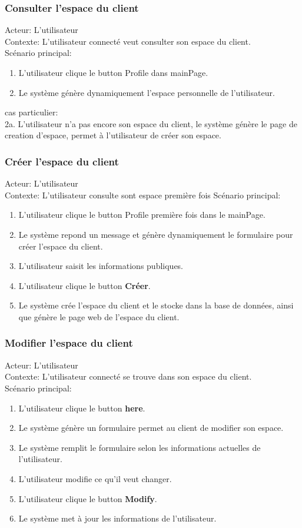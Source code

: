 \documentclass[14px]{article}
\begin{document}
\subsubsection{Consulter l'espace du client}
Acteur: L'utilisateur\\
Contexte: L'utilisateur connecté veut consulter son espace du client.\\
Scénario principal:
\begin{enumerate}
	\item L'utilisateur clique le button Profile dans mainPage.
	\item Le système génère dynamiquement l'espace personnelle de l'utilisateur.
\end{enumerate}
cas particulier:\\
2a. L'utilisateur n'a pas encore son espace du client, le système génère le page de creation d'espace, permet à l'utilisateur de créer son espace.


\subsubsection{Créer l'espace du client}
Acteur: L'utilisateur\\
Contexte: L'utilisateur consulte sont espace première fois
Scénario principal:
\begin{enumerate}
	\item L'utilisateur clique le button Profile première fois dans le mainPage.
	\item Le système repond un message et génère dynamiquement le formulaire pour créer l'espace du client.
	\item L'utilisateur saisit les informations publiques.
	\item L'utilisateur clique le button \textbf{Créer}.
	\item Le système crée l'espace du client et le stocke dans la base de données, ainsi que génère le page web de l'espace du client.
\end{enumerate}

\subsubsection{Modifier l'espace du client}
Acteur: L'utilisateur\\
Contexte: L'utilisateur connecté se trouve dans son espace du client.\\
Scénario principal:
\begin{enumerate}
	\item L'utilisateur clique le button \textbf{here}.
	\item Le système génère un formulaire permet au client de modifier son espace.
	\item Le système remplit le formulaire selon les informations actuelles de l'utilisateur.
	\item L'utilisateur modifie ce qu'il veut changer.
	\item L'utilisateur clique le button \textbf{Modify}.
	\item Le système met à jour les informations de l'utilisateur.
\end{enumerate}
\end{document}
